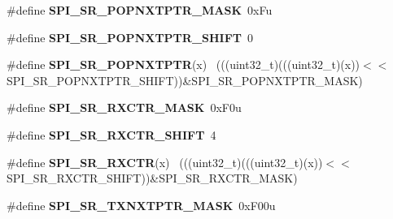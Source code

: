\begin{DoxyCompactItemize}
\item 
\hypertarget{group___s_p_i___register___masks_gabf0bcd5a32bcc6e58bac1a0f826ab3c6}{}\#define {\bfseries S\+P\+I\+\_\+\+S\+R\+\_\+\+P\+O\+P\+N\+X\+T\+P\+T\+R\+\_\+\+M\+A\+S\+K}~0x\+Fu\label{group___s_p_i___register___masks_gabf0bcd5a32bcc6e58bac1a0f826ab3c6}

\item 
\hypertarget{group___s_p_i___register___masks_gac1f2a81bf6d8b44020db098097c74964}{}\#define {\bfseries S\+P\+I\+\_\+\+S\+R\+\_\+\+P\+O\+P\+N\+X\+T\+P\+T\+R\+\_\+\+S\+H\+I\+F\+T}~0\label{group___s_p_i___register___masks_gac1f2a81bf6d8b44020db098097c74964}

\item 
\hypertarget{group___s_p_i___register___masks_ga9e1c7085f14a2aab9d3585f3a81cb618}{}\#define {\bfseries S\+P\+I\+\_\+\+S\+R\+\_\+\+P\+O\+P\+N\+X\+T\+P\+T\+R}(x)                                        ~(((uint32\+\_\+t)(((uint32\+\_\+t)(x))$<$$<$S\+P\+I\+\_\+\+S\+R\+\_\+\+P\+O\+P\+N\+X\+T\+P\+T\+R\+\_\+\+S\+H\+I\+F\+T))\&S\+P\+I\+\_\+\+S\+R\+\_\+\+P\+O\+P\+N\+X\+T\+P\+T\+R\+\_\+\+M\+A\+S\+K)\label{group___s_p_i___register___masks_ga9e1c7085f14a2aab9d3585f3a81cb618}

\item 
\hypertarget{group___s_p_i___register___masks_gad70ca8db9ba4e1d62e081ef648d84752}{}\#define {\bfseries S\+P\+I\+\_\+\+S\+R\+\_\+\+R\+X\+C\+T\+R\+\_\+\+M\+A\+S\+K}~0x\+F0u\label{group___s_p_i___register___masks_gad70ca8db9ba4e1d62e081ef648d84752}

\item 
\hypertarget{group___s_p_i___register___masks_gacd499785f654eb1b4d1ced2bf0b2e7ac}{}\#define {\bfseries S\+P\+I\+\_\+\+S\+R\+\_\+\+R\+X\+C\+T\+R\+\_\+\+S\+H\+I\+F\+T}~4\label{group___s_p_i___register___masks_gacd499785f654eb1b4d1ced2bf0b2e7ac}

\item 
\hypertarget{group___s_p_i___register___masks_ga1635de4a9adc6d7b3a930239484d2fa9}{}\#define {\bfseries S\+P\+I\+\_\+\+S\+R\+\_\+\+R\+X\+C\+T\+R}(x)                                                ~(((uint32\+\_\+t)(((uint32\+\_\+t)(x))$<$$<$S\+P\+I\+\_\+\+S\+R\+\_\+\+R\+X\+C\+T\+R\+\_\+\+S\+H\+I\+F\+T))\&S\+P\+I\+\_\+\+S\+R\+\_\+\+R\+X\+C\+T\+R\+\_\+\+M\+A\+S\+K)\label{group___s_p_i___register___masks_ga1635de4a9adc6d7b3a930239484d2fa9}

\item 
\hypertarget{group___s_p_i___register___masks_ga5526eeae29bb85218c41d8a06608acbd}{}\#define {\bfseries S\+P\+I\+\_\+\+S\+R\+\_\+\+T\+X\+N\+X\+T\+P\+T\+R\+\_\+\+M\+A\+S\+K}~0x\+F00u\label{group___s_p_i___register___masks_ga5526eeae29bb85218c41d8a06608acbd}


\end{DoxyCompactItemize}
